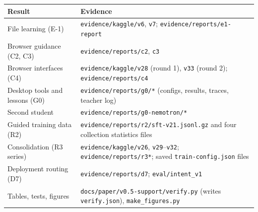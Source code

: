 \documentclass[
  10pt,
]{article}
\newcounter{none} %
\begin{document}
{\def\LTcaptype{none} %
\begin{longtable}[]{@{}
  >{\raggedright\arraybackslash}p{}
  >{\raggedright\arraybackslash}p{}@{}}
\toprule\noalign{}
\begin{minipage}[b]{\linewidth}\raggedright
Result
\end{minipage} & \begin{minipage}[b]{\linewidth}\raggedright
Evidence
\end{minipage} \\
\midrule\noalign{}
\endhead
\bottomrule\noalign{}
\endlastfoot
File learning (E-1) & \texttt{evidence/kaggle/v6}, \texttt{v7};
\texttt{evidence/reports/e1-report} \\
Browser guidance (C2, C3) & \texttt{evidence/reports/c2}, \texttt{c3} \\
Browser interfaces (C4) & \texttt{evidence/kaggle/v28} (round 1),
\texttt{v33} (round 2); \texttt{evidence/reports/c4} \\
Desktop tools and lessons (G0) & \texttt{evidence/reports/g0/*}
(configs, results, traces, teacher log) \\
Second student & \texttt{evidence/reports/g0-nemotron/*} \\
Guided training data (R2) &
\texttt{evidence/reports/r2/sft-v21.jsonl.gz} and four collection
statistics files \\
Consolidation (R3 series) & \texttt{evidence/kaggle/v26},
\texttt{v29}--\texttt{v32}; \texttt{evidence/reports/r3*}; saved
\texttt{train-config.json} files \\
Deployment routing (D7) & \texttt{evidence/reports/d7};
\texttt{eval/intent\_v1} \\
Tables, tests, figures & \texttt{docs/paper/v0.5-support/verify.py}
(writes \texttt{verify.json}), \texttt{make\_figures.py} \\
\end{longtable}
}
\end{document}
